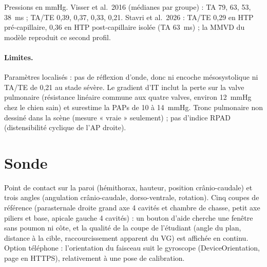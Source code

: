 \documentclass[10pt,a4paper]{article}
\begin{document}
\medskip
Pressions en mmHg. Visser et al.\ 2016 (médianes par groupe) : TA 79, 63, 53, \SI{38}{ms} ; TA/TE 0,39, 0,37, 0,33,
0,21. Stavri et al.\ 2026 : TA/TE 0,29 en HTP pré-capillaire, 0,36 en HTP post-capillaire isolée (TA \SI{63}{ms}) ; la
MMVD du modèle reproduit ce second profil.

\paragraph{Limites.} Paramètres localisés : pas de réflexion d'onde, donc ni encoche mésosystolique ni TA/TE de 0,21
au stade sévère. Le gradient d'IT inclut la perte sur la valve pulmonaire (résistance linéaire commune aux quatre valves,
environ \SI{12}{mmHg} chez le chien sain) et surestime la PAPs de 10 à \SI{14}{mmHg}. Tronc pulmonaire non dessiné dans la
scène (mesure « vraie » seulement) ; pas d'indice RPAD (distensibilité cyclique de l'AP droite).

\section{Sonde}
Point de contact sur la paroi (hémithorax, hauteur, position crânio-caudale) et trois angles (angulation crânio-caudale,
dorso-ventrale, rotation). Cinq coupes de référence (parasternale droite grand axe 4 cavités et chambre de chasse, petit
axe piliers et base, apicale gauche 4 cavités) : un bouton d'aide cherche une fenêtre sans poumon ni côte, et la qualité
de la coupe de l'étudiant (angle du plan, distance à la cible, raccourcissement apparent du VG) est affichée en continu.
Option téléphone : l'orientation du faisceau suit le gyroscope (DeviceOrientation, page en HTTPS), relativement à une
pose de calibration.
\end{document}
